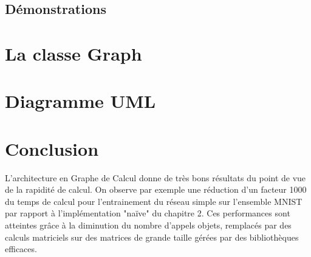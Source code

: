 \subsection{Démonstrations}

\section{La classe Graph}


\section{Diagramme UML}


\section{Conclusion}

L'architecture en Graphe de Calcul donne de très bons résultats du point de vue de la rapidité de calcul. On observe par exemple une réduction d'un facteur 1000 du temps de calcul pour l'entrainement du réseau simple sur l'ensemble MNIST par rapport à l'implémentation "naïve" du chapitre 2. Ces performances sont atteintes grâce à la diminution du nombre d'appels objets, remplacés par des calculs matriciels sur des matrices de grande taille gérées par des bibliothèques efficaces.